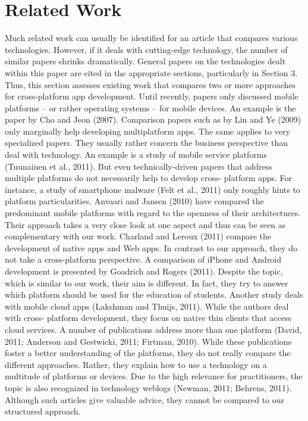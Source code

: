 \documentclass[12pt]{extreport}
\begin{document}
\section*{Related Work}
Much related work can usually be identified for an article that compares various technologies. However, if it deals
with cutting-edge technology, the number of similar papers shrinks dramatically. General papers on the technologies
dealt within this paper are cited in the appropriate sections, particularly in Section 3.
Thus, this section assesses existing work that compares two or more approaches for cross-platform app
development. Until recently, papers only discussed mobile platforms – or rather operating systems – for mobile
devices.
An example is the paper by Cho and Jeon (2007). Comparison papers such as by Lin and Ye (2009) only marginally
help developing multiplatform apps. The same applies to very specialized papers. They usually rather concern the
business perspective than deal with technology. An example is a study of mobile service platforms (Tuunainen et al.,
2011). But even technically-driven papers that address multiple platforms do not necessarily help to develop cross-
platform apps. For instance, a study of smartphone malware (Felt et al., 2011) only roughly hints to platform
particularities. Anvaari and Jansen (2010) have compared the predominant mobile platforms with regard to the
openness of their architectures. Their approach takes a very close look at one aspect and thus can be seen
as complementary with our work. Charland and Leroux (2011) compare the development of native apps and Web
apps. In contrast to our approach, they do not take a cross-platform perspective.
A comparison of iPhone and Android development is presented by Goadrich and Rogers (2011). Despite the topic,
which is similar to our work, their aim is different. In fact, they try to answer which platform should be used for the
education of students.
Another study deals with mobile cloud apps (Lakshman and Thuijs, 2011). While the authors deal with cross-
platform development, they focus on native thin clients that access cloud services.
A number of publications address more than one platform (David, 2011; Anderson and Gestwicki, 2011; Firtman,
2010). While these publications foster a better understanding of the platforms, they do not really compare the
different approaches. Rather, they explain how to use a technology on a multitude of platforms or devices. Due to
the high relevance for practitioners, the topic is also recognized in technology weblogs (Newman, 2011; Behrens,
2011). Although such articles give valuable advice, they cannot be compared to our structured approach.
\end{document}
